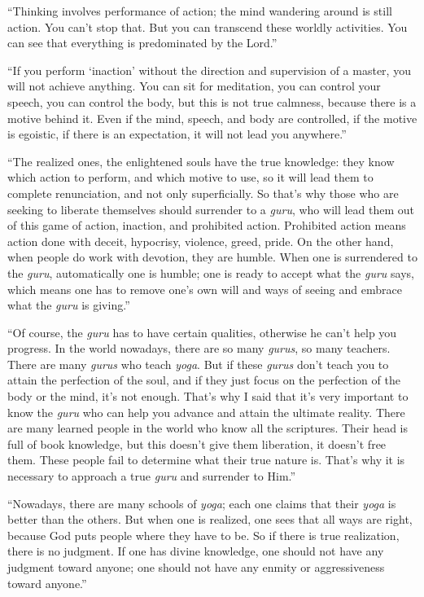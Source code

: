 \enquote{Thinking involves performance of action; the mind wandering around is still action. You can’t stop that. But you can transcend these worldly activities. You can see that everything is predominated by the Lord.}

\enquote{If you perform \enquote{inaction} without the direction and supervision of a master, you will not achieve anything. You can sit for meditation, you can control your speech, you can control the body, but this is not true calmness, because there is a motive behind it. Even if the mind, speech, and body are controlled, if the motive is egoistic, if there is an expectation, it will not lead you anywhere.}

\enquote{The realized ones, the enlightened souls have the true knowledge: they know which action to perform, and which motive to use, so it will lead them to complete renunciation, and not only superficially. So that’s why those who are seeking to liberate themselves should surrender to a \textit{guru}, who will lead them out of this game of action, inaction, and prohibited action. Prohibited action means action done with deceit, hypocrisy, violence, greed, pride. On the other hand, when people do work with devotion, they are humble. When one is surrendered to the \textit{guru}, automatically one is humble; one is ready to accept what the \textit{guru} says, which means one has to remove one’s own will and ways of seeing and embrace what the \textit{guru} is giving.}

\enquote{Of course, the \textit{guru} has to have certain qualities, otherwise he can’t help you progress. In the world nowadays, there are so many \textit{gurus}, so many teachers. There are many \textit{gurus} who teach \textit{yoga}. But if these \textit{gurus} don’t teach you to attain the perfection of the soul, and if they just focus on the perfection of the body or the mind, it’s not enough. That’s why I said that it’s very important to know the \textit{guru} who can help you advance and attain the ultimate reality. There are many learned people in the world who know all the scriptures. Their head is full of book knowledge, but this doesn’t give them liberation, it doesn’t free them. These people fail to determine what their true nature is. That’s why it is necessary to approach a true \textit{guru} and surrender to Him.}

\enquote{Nowadays, there are many schools of \textit{yoga}; each one claims that their \textit{yoga} is better than the others. But when one is realized, one sees that all ways are right, because God puts people where they have to be. So if there is true realization, there is no judgment. If one has divine knowledge, one should not have any judgment toward anyone; one should not have any enmity or aggressiveness toward anyone.}

